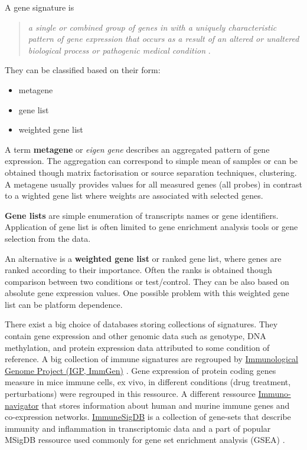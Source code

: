 \documentclass[12pt,]{book}
\providecommand{\tightlist}{%
  \setlength{\itemsep}{0pt}\setlength{\parskip}{0pt}}
\theoremstyle{definition}
\theoremstyle{definition}
\theoremstyle{definition}
\theoremstyle{remark}
\begin{document}
A gene signature is

\begin{quote}
\emph{a single or combined group of genes in with a uniquely
characteristic pattern of gene expression that occurs as a result of an
altered or unaltered biological process or pathogenic medical condition}
\citep{Itadani2008, Liu2008}.
\end{quote}

They can be classified based on their form:

\begin{itemize}
\tightlist
\item
  metagene
\item
  gene list
\item
  weighted gene list
\end{itemize}

A term \textbf{metagene} or \emph{eigen gene} describes an aggregated
pattern of gene expression. The aggregation can correspond to simple
mean of samples or can be obtained though matrix factorisation or source
separation techniques, clustering. A metagene usually provides values
for all measured genes (all probes) in contrast to a wighted gene list
where weights are associated with selected genes.

\textbf{Gene lists} are simple enumeration of transcripts names or gene
identifiers. Application of gene list is often limited to gene
enrichment analysis tools or gene selection from the data.

An alternative is a \textbf{weighted gene list} or ranked gene list,
where genes are ranked according to their importance. Often the ranks is
obtained though comparison between two conditions or test/control. They
can be also based on absolute gene expression values\citep{Lyons2017}.
One possible problem with this weighted gene list can be platform
dependence.

There exist a big choice of databases storing collections of signatures.
They contain gene expression and other genomic data such as genotype,
DNA methylation, and protein expression data attributed to some
condition of reference. A big collection of immune signatures are
regrouped by \href{https://www.immgen.org/}{Immunological Genome Project
(IGP, ImmGen)} \citep{Heng2008}. Gene expression of protein coding genes
measure in mice immune cells, ex vivo, in different conditions (drug
treatment, perturbations) were regrouped in this ressource. A different
ressource
\href{https://sysimm.ifrec.osaka-u.ac.jp/immuno-navigator/}{Immuno-navigator}
\citep{Vandenbon2016} that stores information about human and murine
immune genes and co-expression networks.
\href{http://software.broadinstitute.org/gsea/msigdb/collections.jsp}{ImmuneSigDB}
is a collection of gene-sets that describe immunity and inflammation in
transcriptomic data \citep{Godec2016} and a part of popular MSigDB
ressource used commonly for gene set enrichment analysis (GSEA)
\citep{Subramanian2005}.
\end{document}
